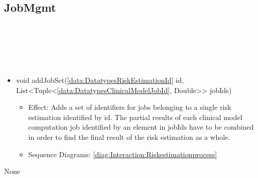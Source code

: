   \subsection{JobMgmt}\label{int:InterfacesJobMgmt}
    \begin{description}
      \item[Provided by:] \iconcomponent{}~
      \item[Required by:] \iconcomponent{}~ 
      \item[Operations:] ~
    \begin{itemize}[noitemsep,nolistsep,leftmargin=-.25cm]
      \item \textsf{void addJobSet(\ref{data:DatatypesRiskEstimationId} id, List\textless{}Tuple\textless{}\ref{data:DatatypesClinicalModelJobId}, Double\textgreater{}\textgreater{} jobIds)}
        \begin{itemize}[noitemsep,nolistsep]
           \item Effect: Adds a set of identifiers for jobs belonging to a
single risk estimation identified by id. The partial
results of each clinical model computation job identified by an
element in jobIds have to be combined in order to find
the final result of the risk estimation as a whole. 
           \item Sequence Diagrams: \cref{diag:Interaction:Riskestimationprocess}
        \end{itemize}
    \end{itemize}
      \item[Diagrams:] None
    \end{description}

